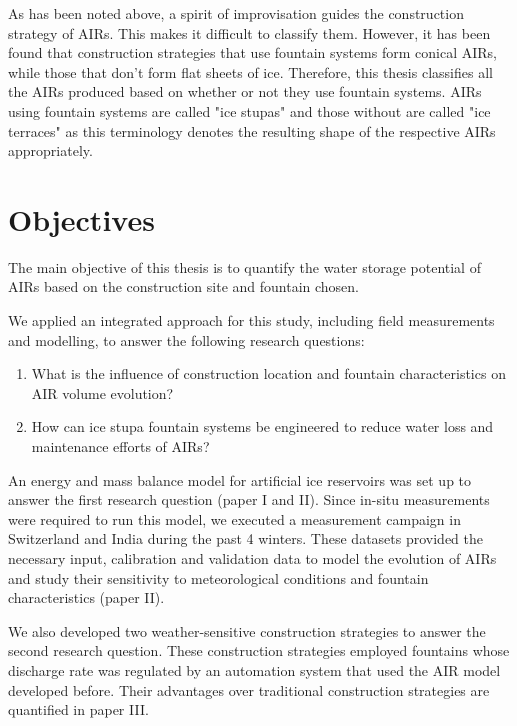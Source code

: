 As has been noted above, a spirit of improvisation guides the construction strategy of AIRs. This makes it
difficult to classify them. However, it has been found that construction strategies that use fountain systems
form conical AIRs, while those that don't form flat sheets of ice. Therefore, this thesis classifies all the
AIRs produced based on whether or not they use fountain systems. AIRs using fountain systems are called "ice
stupas" and those without are called "ice terraces" as this terminology denotes the resulting shape of the
respective AIRs appropriately.

\section{Objectives}

The main objective of this thesis is to quantify the water storage potential of AIRs based on the construction
site and fountain chosen. 

We applied an integrated approach for this study, including field measurements and modelling, to answer the
following research questions: 

\begin{enumerate}

\item What is the influence of construction location and fountain characteristics on AIR volume evolution? 

\item How can ice stupa fountain systems be engineered to reduce water loss and maintenance efforts of AIRs?

\end{enumerate}

An energy and mass balance model for artificial ice reservoirs was set up to answer the first research question
(paper I and II). Since in-situ measurements were required to run this model, we executed a measurement campaign
in Switzerland and India during the past 4 winters. These datasets provided the necessary input, calibration and
validation data to model the evolution of AIRs and study their sensitivity to meteorological conditions and
fountain characteristics (paper II). 

We also developed two weather-sensitive construction strategies to answer the second research question. These
construction strategies employed fountains whose discharge rate was regulated by an automation system that used
the AIR model developed before. Their advantages over traditional construction strategies are quantified in
paper III.

